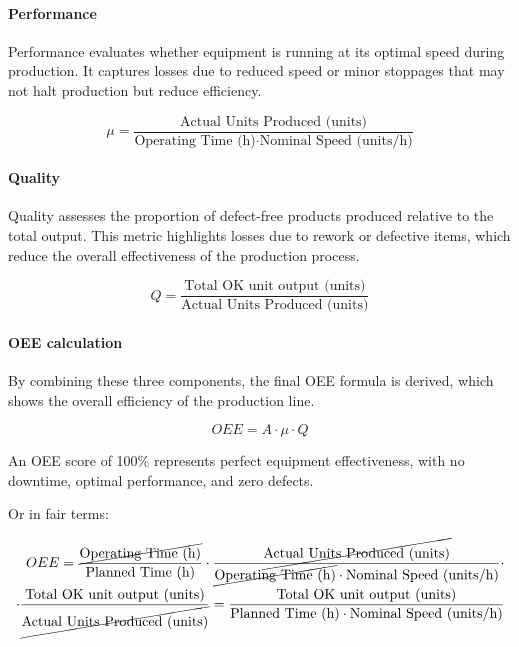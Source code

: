 \documentclass[]{article}
\begin{document}
\paragraph{Performance}\label{performance}
Performance evaluates whether equipment is running at its optimal speed
during production. It captures losses due to reduced speed or minor stoppages that may not
halt production but reduce efficiency.\cite{calandreli_maximizing_2025}

\begin{equation}\label{eq:performance}
  \mu = \frac{\text{Actual Units Produced (units)}}{\text{Operating Time (h)} \cdot \text{Nominal Speed (units/h)}}
\end{equation}

\paragraph{Quality}\label{quality}
Quality assesses the proportion of defect-free products produced relative to the total output. This metric highlights losses due to rework or defective items, which reduce the overall effectiveness of the production process.\cite{calandreli_maximizing_2025}

\begin{equation}\label{eq:quality}
  Q=\frac{\text{Total OK unit output (units)}}{\text{Actual Units Produced (units)}}
\end{equation}

\paragraph{OEE calculation}
By combining these three components, the final OEE formula is derived, which shows the overall efficiency of the production line.

\begin{equation}\label{OEE_calc}
  OEE=A \cdot \mu \cdot Q
\end{equation}

An OEE score of 100\% represents perfect equipment effectiveness, with no downtime, optimal
performance, and zero defects.\cite{pound_factory_2014} 

Or in fair terms:

\begin{equation}\label{OEE_calc_cancel_termns}
  \begin{split}
    OEE = \frac{\cancel{\text{Operating Time (h)}}}{\text{Planned Time (h)}} \cdot \frac{\cancel{\text{Actual Units Produced (units)}}}{\cancel{\text{Operating Time (h)}} \cdot \text{Nominal Speed (units/h)}} \cdot \\
    \cdot \frac{\text{Total OK unit output (units)}}{\cancel{\text{Actual Units Produced (units)}}}=\frac{\text{Total OK unit output (units)}}{\text{Planned Time (h)} \cdot \text{Nominal Speed (units/h)}}
\end{split}
\end{equation}
\end{document}
